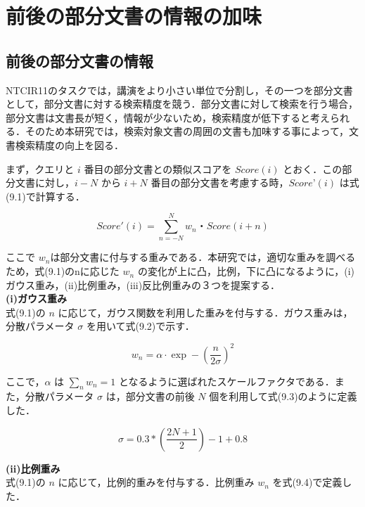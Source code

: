 \chapter{前後の部分文書の情報の加味}

\section{前後の部分文書の情報}
NTCIR11のタスクでは，講演をより小さい単位で分割し，その一つを部分文書として，部分文書に対する検索精度を競う．部分文書に対して検索を行う場合，部分文書は文書長が短く，情報が少ないため，検索精度が低下すると考えられる．そのため本研究では，検索対象文書の周囲の文書も加味する事によって，文書検索精度の向上を図る．


まず，クエリと $i$ 番目の部分文書との類似スコアを $Score(i)$ とおく．この部分文書に対し，$i-N$ から $i+N$ 番目の部分文書を考慮する時，$ Score’(i)$ は式(9.1)で計算する．

\begin{equation}
    Score'(i) = \sum_{n=-N}^N w_n・Score(i + n) 
    \label{zengo1}
\end{equation}

ここで $w_n$は部分文書に付与する重みである．本研究では，適切な重みを調べるため，式(9.1)のnに応じた $w_n$ の変化が上に凸，比例，下に凸になるように，(i)ガウス重み，(ii)比例重み，(iii)反比例重みの３つを提案する．\\

{\bf(i)ガウス重み} \\

式(9.1)の $n$ に応じて，ガウス関数を利用した重みを付与する．ガウス重みは，分散パラメータ $\sigma$ を用いて式(9.2)で示す．

\begin{equation}
    w_n = \alpha⋅\exp⁡-(\frac{n}{2\sigma})^2
    \label{zengo2}
\end{equation}

ここで，$\alpha$ は $\sum_n w_n = 1$ となるように選ばれたスケールファクタである．また，分散パラメータ $\sigma$ は，部分文書の前後 $N$ 個を利用して式(9.3)のように定義した．

\begin{equation}
    \sigma = 0.3 * (\frac{2N+1}{2}) - 1 + 0.8
    \label{zengo3}
\end{equation}

{\bf(ii)比例重み} \\

式(9.1)の $n$ に応じて，比例的重みを付与する．比例重み $w_n$ を式(9.4)で定義した．

